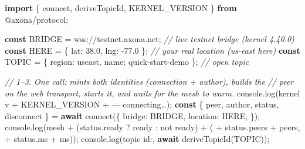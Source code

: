 \documentclass[
  nobib]{tufte-handout}
\newenvironment{Shaded}{}{}
\newcommand{\AttributeTok}[1]{\textcolor[rgb]{0.49,0.56,0.16}{#1}}
\newcommand{\BuiltInTok}[1]{\textcolor[rgb]{0.00,0.50,0.00}{#1}}
\newcommand{\CommentTok}[1]{\textcolor[rgb]{0.38,0.63,0.69}{\textit{#1}}}
\newcommand{\ControlFlowTok}[1]{\textcolor[rgb]{0.00,0.44,0.13}{\textbf{#1}}}
\newcommand{\DataTypeTok}[1]{\textcolor[rgb]{0.56,0.13,0.00}{#1}}
\newcommand{\FloatTok}[1]{\textcolor[rgb]{0.25,0.63,0.44}{#1}}
\newcommand{\FunctionTok}[1]{\textcolor[rgb]{0.02,0.16,0.49}{#1}}
\newcommand{\ImportTok}[1]{\textcolor[rgb]{0.00,0.50,0.00}{\textbf{#1}}}
\newcommand{\KeywordTok}[1]{\textcolor[rgb]{0.00,0.44,0.13}{\textbf{#1}}}
\newcommand{\NormalTok}[1]{#1}
\newcommand{\OperatorTok}[1]{\textcolor[rgb]{0.40,0.40,0.40}{#1}}
\newcommand{\StringTok}[1]{\textcolor[rgb]{0.25,0.44,0.63}{#1}}
\begin{document}
\begin{Shaded}
\begin{Highlighting}[]
\ImportTok{import}\NormalTok{ \{ connect}\OperatorTok{,}\NormalTok{ deriveTopicId}\OperatorTok{,}\NormalTok{ KERNEL\_VERSION \} }\ImportTok{from} \StringTok{\textquotesingle{}@axona/protocol\textquotesingle{}}\OperatorTok{;}

\KeywordTok{const}\NormalTok{ BRIDGE }\OperatorTok{=} \StringTok{\textquotesingle{}wss://testnet.axona.net\textquotesingle{}}\OperatorTok{;}           \CommentTok{// live testnet bridge (kernel 4.40.0)}
\KeywordTok{const}\NormalTok{ HERE   }\OperatorTok{=}\NormalTok{ \{ }\DataTypeTok{lat}\OperatorTok{:} \FloatTok{38.0}\OperatorTok{,} \DataTypeTok{lng}\OperatorTok{:} \OperatorTok{{-}}\FloatTok{77.0}\NormalTok{ \}}\OperatorTok{;}           \CommentTok{// your real location (us{-}east here)}
\KeywordTok{const}\NormalTok{ TOPIC  }\OperatorTok{=}\NormalTok{ \{ }\DataTypeTok{region}\OperatorTok{:} \StringTok{\textquotesingle{}useast\textquotesingle{}}\OperatorTok{,} \DataTypeTok{name}\OperatorTok{:} \StringTok{\textquotesingle{}quick{-}start{-}demo\textquotesingle{}}\NormalTok{ \}}\OperatorTok{;}   \CommentTok{// open topic}

\CommentTok{// 1–3. One call: mints both identities (connection + author), builds the}
\CommentTok{//      peer on the web transport, starts it, and waits for the mesh to warm.}
\BuiltInTok{console}\OperatorTok{.}\FunctionTok{log}\NormalTok{(}\StringTok{\textquotesingle{}kernel v\textquotesingle{}} \OperatorTok{+}\NormalTok{ KERNEL\_VERSION }\OperatorTok{+} \StringTok{\textquotesingle{} — connecting…\textquotesingle{}}\NormalTok{)}\OperatorTok{;}
\KeywordTok{const}\NormalTok{ \{ peer}\OperatorTok{,}\NormalTok{ author}\OperatorTok{,}\NormalTok{ status}\OperatorTok{,}\NormalTok{ disconnect \} }\OperatorTok{=} \ControlFlowTok{await} \FunctionTok{connect}\NormalTok{(\{}
  \DataTypeTok{bridge}\OperatorTok{:}\NormalTok{   BRIDGE}\OperatorTok{,}
  \DataTypeTok{location}\OperatorTok{:}\NormalTok{ HERE}\OperatorTok{,}
\NormalTok{\})}\OperatorTok{;}
\BuiltInTok{console}\OperatorTok{.}\FunctionTok{log}\NormalTok{(}\StringTok{\textquotesingle{}mesh \textquotesingle{}} \OperatorTok{+}\NormalTok{ (status}\OperatorTok{.}\AttributeTok{ready} \OperatorTok{?} \StringTok{\textquotesingle{}ready\textquotesingle{}} \OperatorTok{:} \StringTok{\textquotesingle{}not ready\textquotesingle{}}\NormalTok{) }\OperatorTok{+} \StringTok{\textquotesingle{} (\textquotesingle{}} \OperatorTok{+}\NormalTok{ status}\OperatorTok{.}\AttributeTok{peers} \OperatorTok{+} \StringTok{\textquotesingle{} peers, \textquotesingle{}} \OperatorTok{+}\NormalTok{ status}\OperatorTok{.}\AttributeTok{ms} \OperatorTok{+} \StringTok{\textquotesingle{}ms)\textquotesingle{}}\NormalTok{)}\OperatorTok{;}
\BuiltInTok{console}\OperatorTok{.}\FunctionTok{log}\NormalTok{(}\StringTok{\textquotesingle{}topic id:\textquotesingle{}}\OperatorTok{,} \ControlFlowTok{await} \FunctionTok{deriveTopicId}\NormalTok{(TOPIC))}\OperatorTok{;}


\end{Highlighting}
\end{Shaded}
\end{document}
